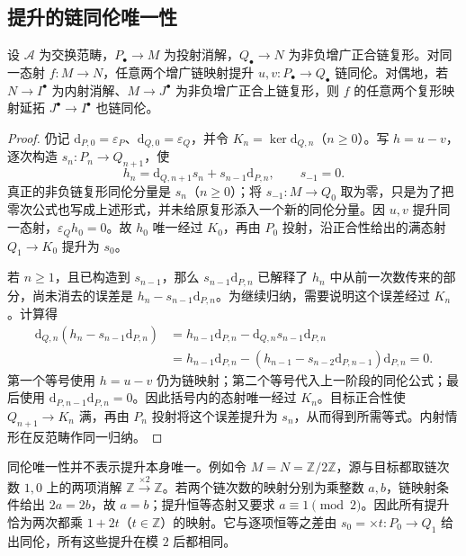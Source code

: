 \subsection{提升的链同伦唯一性}
\label{b4:subsec:0702:02}

\begin{proposition}\label{b4:prop:comparison-homotopy-unique}
	设 \(\mathcal A\) 为交换范畴，\(P_\bullet\to M\) 为投射消解，\(Q_\bullet\to N\) 为非负增广正合链复形。对同一态射 \(f:M\to N\)，任意两个增广链映射提升 \(u,v:P_\bullet\to Q_\bullet\) 链同伦。对偶地，若 \(N\to I^\bullet\) 为内射消解、\(M\to J^\bullet\) 为非负增广正合上链复形，则 \(f\) 的任意两个复形映射延拓 \(J^\bullet\to I^\bullet\) 也链同伦。
\end{proposition}
\begin{proof}
	仍记 \(\mathrm{d}_{P,0}=\varepsilon_P\)、\(\mathrm{d}_{Q,0}=\varepsilon_Q\)，并令 \(K_n=\ker\mathrm{d}_{Q,n}\)（\(n\ge0\)）。写 \(h=u-v\)，逐次构造 \(s_n:P_n\to Q_{n+1}\)，使
	\[
		h_n=\mathrm{d}_{Q,n+1}s_n+s_{n-1}\mathrm{d}_{P,n},\qquad s_{-1}=0.
	\]
	真正的非负链复形同伦分量是 \(s_n\)（\(n\ge0\)）；将 \(s_{-1}:M\to Q_0\) 取为零，只是为了把零次公式也写成上述形式，并未给原复形添入一个新的同伦分量。因 \(u,v\) 提升同一态射，\(\varepsilon_Qh_0=0\)。故 \(h_0\) 唯一经过 \(K_0\)，再由 \(P_0\) 投射，沿正合性给出的满态射 \(Q_1\to K_0\) 提升为 \(s_0\)。

	若 \(n\ge1\)，且已构造到 \(s_{n-1}\)，那么 \(s_{n-1}\mathrm{d}_{P,n}\) 已解释了 \(h_n\) 中从前一次数传来的部分，尚未消去的误差是 \(h_n-s_{n-1}\mathrm{d}_{P,n}\)。为继续归纳，需要说明这个误差经过 \(K_n\)。计算得
	\[
		\begin{aligned}
			\mathrm{d}_{Q,n}(h_n-s_{n-1}\mathrm{d}_{P,n}) &=h_{n-1}\mathrm{d}_{P,n} -\mathrm{d}_{Q,n}s_{n-1}\mathrm{d}_{P,n}\\
			&=h_{n-1}\mathrm{d}_{P,n} -(h_{n-1}-s_{n-2}\mathrm{d}_{P,n-1})\mathrm{d}_{P,n}=0.
		\end{aligned}
	\]
	第一个等号使用 \(h=u-v\) 仍为链映射；第二个等号代入上一阶段的同伦公式；最后使用 \(\mathrm{d}_{P,n-1}\mathrm{d}_{P,n}=0\)。因此括号内的态射唯一经过 \(K_n\)。目标正合性使 \(Q_{n+1}\to K_n\) 满，再由 \(P_n\) 投射将这个误差提升为 \(s_n\)，从而得到所需等式。内射情形在反范畴作同一归纳。
\end{proof}

同伦唯一性并不表示提升本身唯一。例如令 \(M=N=\mathbb Z/2\mathbb Z\)，源与目标都取链次数 \(1,0\) 上的两项消解 \(\mathbb Z\xrightarrow{\times2}\mathbb Z\)。若两个链次数的映射分别为乘整数 \(a,b\)，链映射条件给出 \(2a=2b\)，故 \(a=b\)；提升恒等态射又要求 \(a\equiv1\pmod2\)。因此所有提升恰为两次都乘 \(1+2t\)（\(t\in\mathbb Z\)）的映射。它与逐项恒等之差由 \(s_0=\times t:P_0\to Q_1\) 给出同伦，所有这些提升在模 \(2\) 后都相同。

